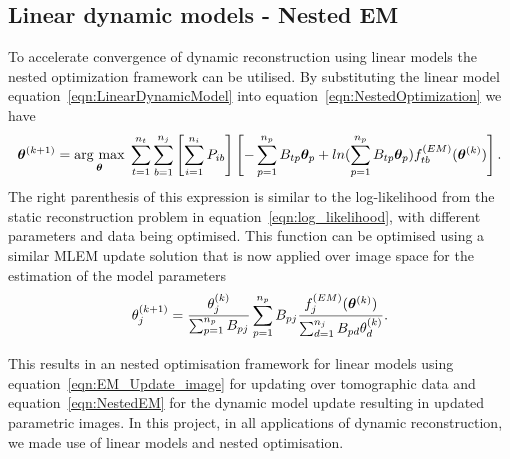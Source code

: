\subsection{Linear dynamic models - Nested EM}
To accelerate convergence of dynamic reconstruction using linear models the nested optimization framework can be utilised. By substituting the linear model equation~\ref{eqn:LinearDynamicModel} into equation~\ref{eqn:NestedOptimization} we have
\begin{equation}
\bm{\theta}^{(k+1)} = 
\underset{\bm{\theta}}{\operatorname{arg}\,\operatorname{max}}\;
\sum_{t=1}^{n_t} \sum_{b=1}^{n_j} \left[ \sum_{i=1}^{n_i}  P_{ib} \right]
\left[ 
-\sum_{p=1}^{n_p} B_{tp} \bm\theta_{p} + 
ln( \sum_{p=1}^{n_p} B_{tp} \bm\theta_{p}) 
f_{tb}^{(EM)}(\bm{\theta}^{(k)})
\right] \\ .
\end{equation}
The right parenthesis of this expression is similar to the log-likelihood from the static reconstruction problem in equation~\ref{eqn:log_likelihood}, with different parameters and data being optimised. This function can be optimised using a similar MLEM update solution that is now applied over image space for the estimation of the model parameters 
\begin{equation}
\theta_j^{(k+1)} = \frac{\theta_j^{(k)}}
{\sum_{p=1}^{n_p} B_{pj}} 
\sum_{p=1}^{n_p} B_{pj} 
\frac{f_{j}^{(EM)}(\bm{\theta}^{(k)})}{\sum_{d=1}^{n_j} B_{pd}\theta_d^{(k)} } \\.
\label{eqn:NestedEM}
\end{equation}

This results in an nested optimisation framework for linear models using equation~\ref{eqn:EM_Update_image} for updating over tomographic data and equation~\ref{eqn:NestedEM} for the dynamic model update resulting in updated parametric images. 
In this project, in all applications of dynamic reconstruction, we made use of linear models and nested optimisation.
